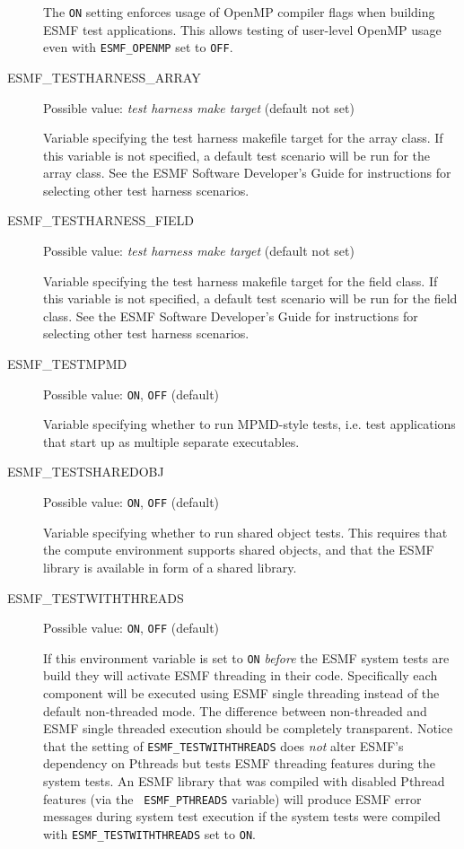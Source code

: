 \begin{description}
The {\tt ON} setting enforces usage of OpenMP compiler flags when building ESMF test applications. This allows testing of user-level OpenMP usage even with {\tt ESMF\_OPENMP} set to {\tt OFF}.

\item[ESMF\_TESTHARNESS\_ARRAY]
Possible value: {\em test harness make target} (default not set)

Variable specifying the test harness makefile target for the array class.  If this variable is not specified, a default test scenario will be run for the array class.  See the ESMF Software Developer's Guide for instructions for selecting other test harness scenarios.

\item[ESMF\_TESTHARNESS\_FIELD]
Possible value: {\em test harness make target} (default not set)

Variable specifying the test harness makefile target for the field class.  If this variable is not specified, a default test scenario will be run for the field class.  See the ESMF Software Developer's Guide for instructions for selecting other test harness scenarios.

\item[ESMF\_TESTMPMD]
Possible value: {\tt ON}, {\tt OFF} (default)

Variable specifying whether to run MPMD-style tests, i.e. test applications
that start up as multiple separate executables.

\item[ESMF\_TESTSHAREDOBJ]
Possible value: {\tt ON}, {\tt OFF} (default)

Variable specifying whether to run shared object tests. This requires that the compute environment supports shared objects, and that the ESMF library is available in form of a shared library.

\item[ESMF\_TESTWITHTHREADS]
Possible value: {\tt ON}, {\tt OFF} (default)

If this environment variable is set to {\tt ON} {\em before} the ESMF system
tests are build they will activate ESMF threading in their code. Specifically
each component will be executed using ESMF single threading instead of the
default non-threaded mode. The difference between non-threaded and ESMF
single threaded execution should be completely transparent. Notice that the
setting of {\tt ESMF\_TESTWITHTHREADS} does {\em not} alter ESMF's dependency
on Pthreads but tests ESMF threading features during the system tests. An
ESMF library that was compiled with disabled Pthread features (via the {\tt
ESMF\_PTHREADS} variable) will produce ESMF error messages during system test
execution if the system tests were compiled with {\tt ESMF\_TESTWITHTHREADS}
set to {\tt ON}.


\end{description}
